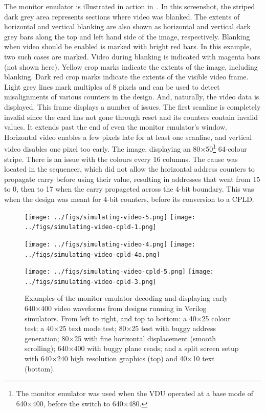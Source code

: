 The monitor emulator is illustrated in action in~. In
this screenshot, the striped dark grey area represents sections where video was
blanked. The extents of horizontal and vertical blanking are also shown as
horizontal and vertical dark grey bars along the top and left hand side of the
image, respectively. Blanking when video should be enabled is marked with
bright red bars. In this example, two such cases are marked. Video during
blanking is indicated with magenta bars (not shown here). Yellow crop marks
indicate the extents of the image, including blanking. Dark red crop marks
indicate the extents of the visible video frame. Light grey lines mark
multiples of 8 pixels and can be used to detect misalignments of various
counters in the design. And, naturally, the video data is displayed. This frame
displays a number of issues. The first scanline is completely invalid since the
card has not gone through reset and its counters contain invalid values. It
extends past the end of even the monitor emulator's window. Horizontal video
enables a few pixels late for at least one scanline, and vertical video
disables one pixel too early. The image, displaying an 80×50\footnote{The
  monitor emulator was used when the VDU operated at a base mode of 640×400,
  before the switch to 640×480.} 64-colour stripe. There is an issue with the
colours every 16 columns. The cause was located in the sequencer, which did not
allow the horizontal address counters to propagate carry before using their
value, resulting in addresses that went from 15 to 0, then to 17 when the carry
propageted across the 4-bit boundary. This was when the design was meant for
4-bit  counters, before its conversion to a CPLD.

\begin{figure}
  \centering
  \texttt{[image: ../figs/simulating-video-5.png]}
  \hfill
  \texttt{[image: ../figs/simulating-video-cpld-1.png]}
  \vspace{1em}

  \texttt{[image: ../figs/simulating-video-4.png]}
  \hfill
  \texttt{[image: ../figs/simulating-video-cpld-4a.png]}
  \vspace{1em}

  \texttt{[image: ../figs/simulating-video-cpld-5.png]}
  \hfill
  \texttt{[image: ../figs/simulating-video-cpld-3.png]}
  \caption[Monitor Emulator Examples]{\label{fig:vdu:monitor-emu-examples}Examples of the monitor
    emulator decoding and displaying early 640×400 video waveforms from designs
    running in Verilog simulators. From left to right, and top to bottom: a
    40×25 colour test; a 40×25 text mode test; 80×25 test with buggy address
    generation; 80×25 with fine horizontal displacement (smooth scrolling);
    640×400 with buggy plane reads; and a split screen setup with 640×240 high
    resolution graphics (top) and 40×10 text (bottom).}
\end{figure}

